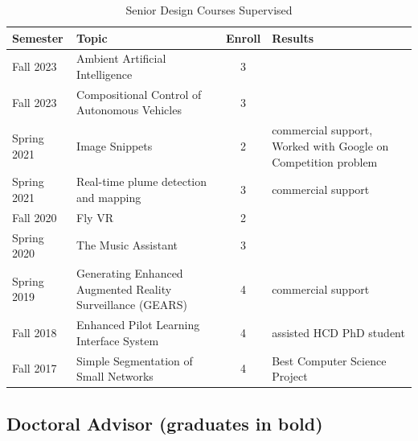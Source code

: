 \documentclass[12pt,letterpaper]{report}
\begin{document}
\begin{table}\caption{Senior Design Courses Supervised}
\label{srdesign}
\center
\begin{tabular}{| l | p{2in} | c | p{2in} |}
Semester & Topic & Enroll  & Results \\ \hline
Fall 2023 & Ambient Artificial Intelligence  & 3 & \\
Fall 2023 & Compositional Control of Autonomous Vehicles & 3 &  \\
Spring 2021 & Image Snippets & 2 & commercial support, Worked with Google on Competition problem \\
Spring 2021 & Real-time plume detection and mapping & 3 & commercial support \\
Fall 2020 & Fly VR & 2 & \\
Spring 2020 & The Music Assistant & 3 & \\
Spring 2019 & Generating Enhanced Augmented Reality Surveillance (GEARS) & 4 & commercial support \\
Fall 2018 & Enhanced Pilot Learning Interface System & 4 & assisted HCD PhD student \\
Fall 2017 & Simple Segmentation of Small Networks & 4 & Best Computer Science Project \\
\end{tabular}
\end{table}


\newpage
    \subsection*{Doctoral Advisor (graduates in bold)}
\end{document}
